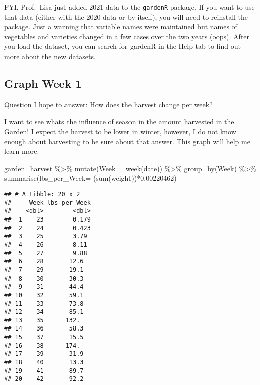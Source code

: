 \documentclass[
]{article}
\newenvironment{Shaded}{\begin{snugshade}}{\end{snugshade}}
\newcommand{\AttributeTok}[1]{\textcolor[rgb]{0.77,0.63,0.00}{#1}}
\newcommand{\FloatTok}[1]{\textcolor[rgb]{0.00,0.00,0.81}{#1}}
\newcommand{\FunctionTok}[1]{\textcolor[rgb]{0.00,0.00,0.00}{#1}}
\newcommand{\NormalTok}[1]{#1}
\newcommand{\SpecialCharTok}[1]{\textcolor[rgb]{0.00,0.00,0.00}{#1}}
\begin{document}
FYI, Prof.~Lisa just added 2021 data to the \texttt{gardenR} package. If
you want to use that data (either with the 2020 data or by itself), you
will need to reinstall the package. Just a warning that variable names
were maintained but names of vegetables and varieties changed in a few
cases over the two years (oops). After you load the dataset, you can
search for gardenR in the Help tab to find out more about the new
datasets.

\hypertarget{graph-week-1}{%
\subsection{Graph Week 1}\label{graph-week-1}}

Question I hope to answer: How does the harvest change per week?

I want to see whats the influence of season in the amount harvested in
the Garden! I expect the harvest to be lower in winter, however, I do
not know enough about harvesting to be sure about that answer. This
graph will help me learn more.

\begin{Shaded}
\begin{Highlighting}[]
\NormalTok{garden\_harvest }\SpecialCharTok{\%\textgreater{}\%} 
  \FunctionTok{mutate}\NormalTok{(}\AttributeTok{Week =} \FunctionTok{week}\NormalTok{(date)) }\SpecialCharTok{\%\textgreater{}\%} 
  \FunctionTok{group\_by}\NormalTok{(Week) }\SpecialCharTok{\%\textgreater{}\%} 
  \FunctionTok{summarise}\NormalTok{(}\AttributeTok{lbs\_per\_Week=}\NormalTok{ (}\FunctionTok{sum}\NormalTok{(weight))}\SpecialCharTok{*}\FloatTok{0.00220462}\NormalTok{)}
\end{Highlighting}
\end{Shaded}

\begin{verbatim}
## # A tibble: 20 x 2
##     Week lbs_per_Week
##    <dbl>        <dbl>
##  1    23        0.179
##  2    24        0.423
##  3    25        3.79 
##  4    26        8.11 
##  5    27        9.88 
##  6    28       12.6  
##  7    29       19.1  
##  8    30       30.3  
##  9    31       44.4  
## 10    32       59.1  
## 11    33       73.8  
## 12    34       85.1  
## 13    35      132.   
## 14    36       58.3  
## 15    37       15.5  
## 16    38      174.   
## 17    39       31.9  
## 18    40       13.3  
## 19    41       89.7  
## 20    42       92.2
\end{verbatim}
\end{document}
